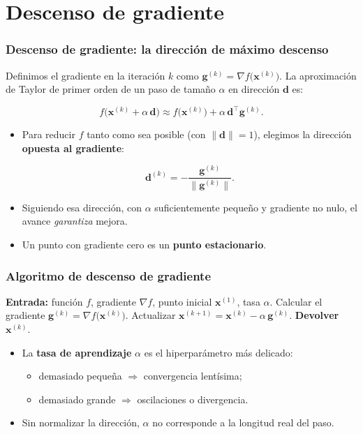 \documentclass[aspectratio=169, 10pt]{beamer}
\newcommand{\gv}{\bm{g}}
\newcommand{\xv}{\bm{x}}
\newcommand{\dv}{\bm{d}}
\newcommand{\grad}{\nabla}
\newcommand{\formula}[1]{%
	\begin{tcolorbox}[colback=UCMBlue!8, colframe=UCMBlue, arc=4pt,
		boxsep=2pt, left=6pt, right=6pt, top=3pt, bottom=3pt]
		#1
	\end{tcolorbox}
}
\begin{document}
\section{Descenso de gradiente}

\begin{frame}
\frametitle{Descenso de gradiente: la direcci\'on de m\'aximo descenso}
Definimos el gradiente en la iteraci\'on $k$ como $\gv^{(k)}=\grad f\big(\xv^{(k)}\big)$. La aproximaci\'on de Taylor de primer orden de un paso de tama\~no $\alpha$ en direcci\'on $\dv$ es:
\formula{\[
f\big(\xv^{(k)} + \alpha\,\dv\big) \approx f\big(\xv^{(k)}\big) + \alpha\,\dv^{\top}\gv^{(k)}.
\]}
\pause
\begin{itemize}
	\item Para reducir $f$ tanto como sea posible (con $\|\dv\|=1$), elegimos la direcci\'on \textbf{opuesta al gradiente}:
	\formula{\[ \dv^{(k)} = -\frac{\gv^{(k)}}{\|\gv^{(k)}\|}. \]}
	\pause
	\item Siguiendo esa direcci\'on, con $\alpha$ suficientemente peque\~no y gradiente no nulo, el avance \emph{garantiza} mejora.
	\item Un punto con gradiente cero es un \textbf{punto estacionario}.
\end{itemize}
\end{frame}

\begin{frame}
\frametitle{Algoritmo de descenso de gradiente}
\begin{algorithmic}[1]
\STATE \textbf{Entrada:} funci\'on $f$, gradiente $\grad f$, punto inicial $\xv^{(1)}$, tasa $\alpha$.
  \STATE Calcular el gradiente $\gv^{(k)} = \grad f\big(\xv^{(k)}\big)$.
  \STATE Actualizar $\xv^{(k+1)} = \xv^{(k)} - \alpha\,\gv^{(k)}$.
\ENDFOR
\STATE \textbf{Devolver} $\xv^{(k)}$.
\end{algorithmic}
\vspace{0.8em}
\begin{itemize}
	\item La \textbf{tasa de aprendizaje} $\alpha$ es el hiperpar\'ametro m\'as delicado:
	\begin{itemize}
		\item demasiado peque\~na $\Rightarrow$ convergencia lent\'isima;
		\item demasiado grande $\Rightarrow$ oscilaciones o divergencia.
	\end{itemize}
	\pause
	\item Sin normalizar la direcci\'on, $\alpha$ no corresponde a la longitud real del paso.
\end{itemize}
\end{frame}
\end{document}
